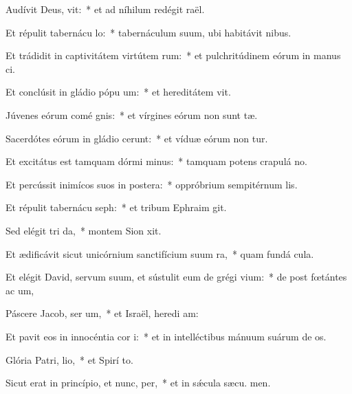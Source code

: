 \item Audívit Deus,  vit:~* et ad níhilum redégit  raël.
\item Et répulit tabernácu lo:~* tabernáculum suum, ubi habitávit  nibus.
\item Et trádidit in captivitátem virtútem rum:~* et pulchritúdinem eórum in manus ci.
\item Et conclúsit in gládio pópu um:~* et hereditátem  vit.
\item Júvenes eórum comé gnis:~* et vírgines eórum non sunt tæ.
\item Sacerdótes eórum in gládio cerunt:~* et víduæ eórum non tur.
\item Et excitátus est tamquam dórmi minus:~* tamquam potens crapulá  no.
\item Et percússit inimícos suos in postera:~* oppróbrium sempitérnum  lis.
\item Et répulit tabernácu seph:~* et tribum Ephraim  git.
\item Sed elégit tri da,~* montem Sion  xit.
\item Et ædificávit sicut unicórnium sanctifícium suum  ra,~* quam fundá  cula.
\item Et elégit David, servum suum, et sústulit eum de grégi vium:~* de post fœtántes ac um,
\item Páscere Jacob, ser um,~* et Israël, heredi am:
\item Et pavit eos in innocéntia cor i:~* et in intelléctibus mánuum suárum de os.
\item Glória Patri,  lio,~* et Spirí to.
\item Sicut erat in princípio, et nunc,  per,~* et in sǽcula sæcu. men.
